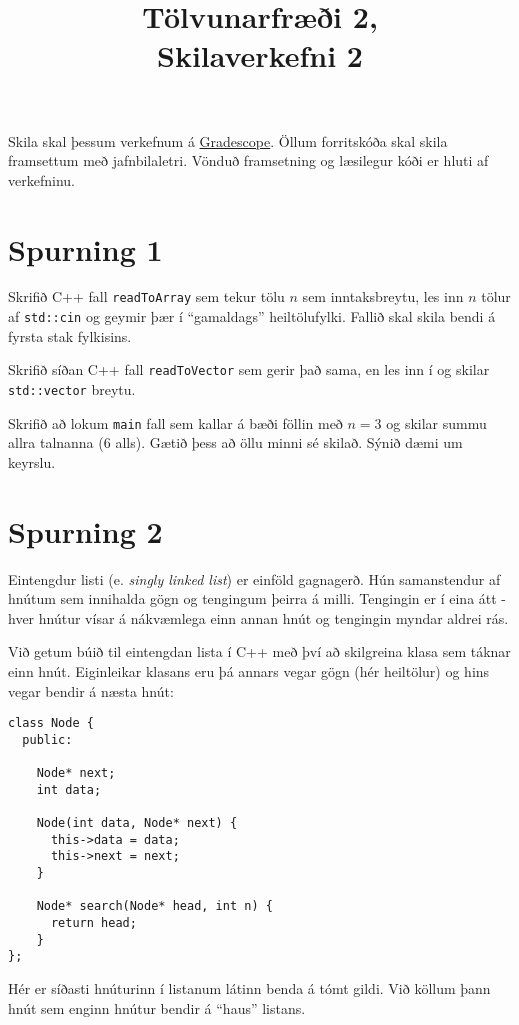 \documentclass{article}
\title{Tölvunarfræði 2, \semester \\ Skilaverkefni 2}
\author{}
\begin{document}
\maketitle
{}

Skila skal þessum verkefnum á \href{https://gradescope.com/courses/5640}{Gradescope}. Öllum forritskóða skal skila framsettum með jafnbilaletri. Vönduð framsetning og læsilegur kóði er hluti af verkefninu.

\section{Spurning 1}
Skrifið C++ fall \texttt{readToArray} sem tekur tölu $n$ sem inntaksbreytu, les inn $n$ tölur af \texttt{std::cin} og geymir þær í ``gamaldags'' heiltölufylki. Fallið skal skila bendi á fyrsta stak fylkisins.

Skrifið síðan C++ fall \texttt{readToVector} sem gerir það sama, en les inn í og skilar \texttt{std::vector} breytu.

Skrifið að lokum \texttt{main} fall sem kallar á bæði föllin með $n = 3$ og skilar summu allra talnanna (6 alls). Gætið þess að öllu minni sé skilað. Sýnið dæmi um keyrslu.

\section{Spurning 2}
Eintengdur listi (e. \emph{singly linked list}) er einföld gagnagerð. Hún samanstendur af hnútum sem innihalda gögn og tengingum þeirra á milli. Tengingin er í eina átt - hver hnútur vísar á nákvæmlega einn annan hnút og tengingin myndar aldrei rás.

Við getum búið til eintengdan lista í C++ með því að skilgreina klasa sem táknar einn hnút. Eiginleikar klasans eru þá annars vegar gögn (hér heiltölur) og hins vegar bendir á næsta hnút:

\begin{verbatim}
class Node {
  public:
    
    Node* next;
    int data;
    
    Node(int data, Node* next) {
      this->data = data;
      this->next = next;
    }

    Node* search(Node* head, int n) {
      return head;
    }
};
\end{verbatim}

Hér er síðasti hnúturinn í listanum látinn benda á tómt gildi. Við köllum þann hnút sem enginn hnútur bendir á ``haus'' listans.
\end{document}
